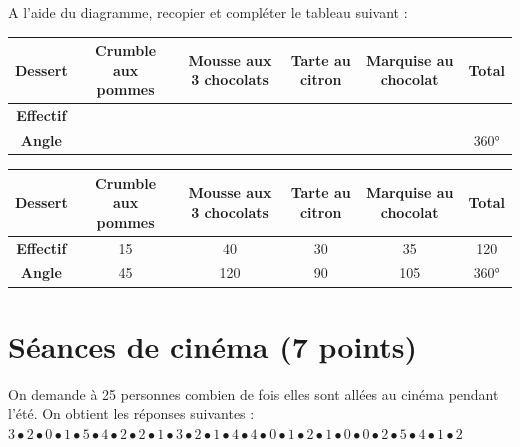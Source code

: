 \documentclass[a4paper,11pt]{exam}
\begin{document}
	\begin{questions}
		\question[5] A l'aide du diagramme, recopier et compléter le tableau suivant :
	
		\begin{footnotesize}
			\begin{tabular}{|@{\ }c@{\ }|@{\ }c@{\ }|@{\ }c@{\ }|@{\ }c@{\ }|@{\ }c@{\ }|@{\ }c@{\ }|}
				\hline
				\textbf{Dessert} & \textbf{Crumble aux pommes} & \textbf{Mousse aux 3 chocolats} & \textbf{Tarte au citron}  & \textbf{Marquise au chocolat} & \textbf{Total}\\
				\hline
				\textbf{Effectif} &  &   &  &  & \\
				\hline
				\textbf{Angle} &  &   &  &  & 360°\\ 
				\hline
			\end{tabular}
		\end{footnotesize}
	
		
		
		\begin{solution}
			\begin{footnotesize}
				\begin{tabular}{|@{\ }c@{\ }|@{\ }c@{\ }|@{\ }c@{\ }|@{\ }c@{\ }|@{\ }c@{\ }|@{\ }c@{\ }|}
					\hline
					\textbf{Dessert} & \textbf{Crumble aux pommes} & \textbf{Mousse aux 3 chocolats} & \textbf{Tarte au citron}  & \textbf{Marquise au chocolat} & \textbf{Total}\\
					\hline
					\textbf{Effectif} & 15 & 40  & 30 & 35 & 120 \\
					\hline
					\textbf{Angle} & 45 & 120  & 90 & 105 & 360°\\ 
					\hline
				\end{tabular}
			\end{footnotesize}
		\end{solution}
	\end{questions}
	
\section{Séances de cinéma (7 points)}

	On demande à 25 personnes combien de fois elles sont allées au cinéma pendant l'été. On obtient les réponses suivantes : \\
	
	$3 \bullet 2 \bullet 0 \bullet 1 \bullet 5 \bullet 4 \bullet 2 \bullet 2 \bullet 1 \bullet 3 \bullet 2 \bullet 1 \bullet 4 \bullet 4 \bullet 0 \bullet 1 \bullet 2 \bullet 1 \bullet 0 \bullet 0 \bullet 2 \bullet 5 \bullet 4 \bullet 1 \bullet 2$
	
\end{document}
